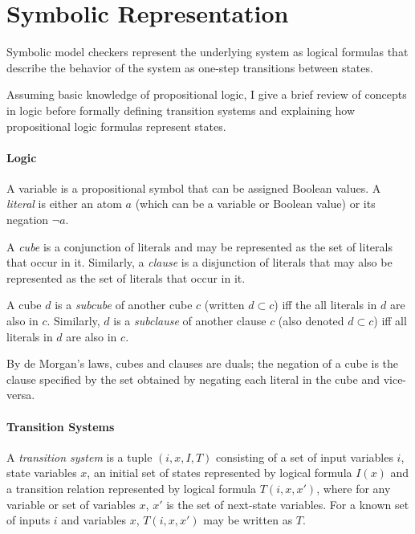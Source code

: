 \documentclass[12pt,a4paper,twoside,openright]{report}
\begin{document}
{\section{Symbolic Representation}
\label{prep:logic}

Symbolic model checkers represent the underlying system as
logical formulas that describe the behavior of the system as one-step transitions
between states. %

Assuming basic knowledge of propositional logic,
I give a brief review of concepts in logic before formally defining transition systems
and explaining how propositional logic formulas represent states.

\paragraph{Logic}{
A variable is a propositional symbol that can be assigned Boolean values.
A \emph{literal} is either an atom $a$ (which can
be a variable or Boolean value) or its negation $\neg a$.

A \emph{cube} is a conjunction of literals and may be represented as the set
of literals that occur in it. Similarly, a \emph{clause} is a disjunction of literals that
may also be represented as the set of literals that occur in it.

A cube $d$ is a \emph{subcube} of another cube $c$ (written $d \subset c$)
iff the all literals in $d$ are also in $c$.
Similarly, $d$ is a \emph{subclause} of another clause $c$ (also
denoted $d \subset c$) iff all literals in $d$ are also in $c$.

By de Morgan's laws, cubes and clauses are duals; the negation of a cube is the
clause specified by the set obtained by negating each literal in the cube
and vice-versa.}


\paragraph{Transition Systems}{
A \emph{transition system} is a tuple $(i,x,I,T)$ consisting of a set of input
variables $i$, state variables $x$, an initial
set of states represented by logical formula $I(x)$ and
a transition relation represented by logical formula $T(i,x,x')$,
where for any variable or set of variables $x$, $x'$ is the set of next-state variables. 
For a known set of inputs $i$ and variables $x$, $T(i,x,x')$ may be written
as $T$.

}}
\end{document}
